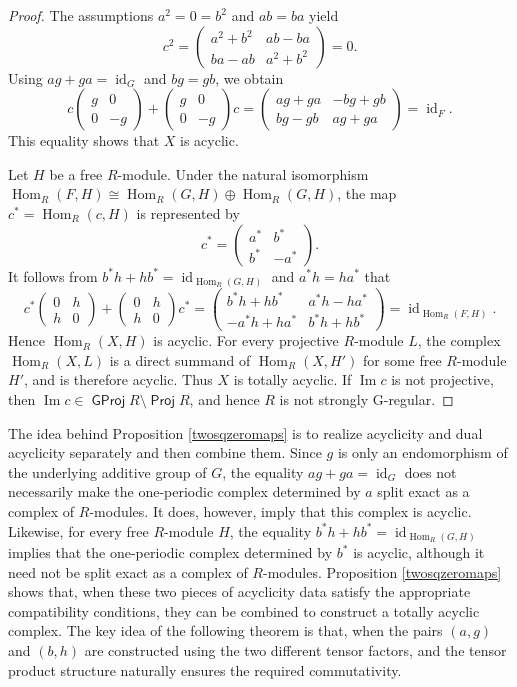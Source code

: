 \documentclass{amsart}
\theoremstyle{definition}
\theoremstyle{remark}
\numberwithin{equation}{thm}
\def\GProj{\operatorname{\mathsf{GProj}}}
\def\Hom{\operatorname{Hom}}
\def\id{\operatorname{id}}
\def\Im{\operatorname{Im}}
\def\Proj{\operatorname{\mathsf{Proj}}}
\begin{document}
\begin{proof}
The assumptions $a^2=0=b^2$ and $ab=ba$ yield
$$
c^2=
\begin{pmatrix}
a^2+b^2&ab-ba\\
ba-ab&a^2+b^2
\end{pmatrix}
=0.
$$
Using $ag+ga=\id_G$ and $bg=gb$, we obtain
$$
c
\begin{pmatrix}
g&0\\
0&-g
\end{pmatrix}
+
\begin{pmatrix}
g&0\\
0&-g
\end{pmatrix}c
=
\begin{pmatrix}
ag+ga&-bg+gb\\
bg-gb&ag+ga
\end{pmatrix}
=\id_F.
$$
This equality shows that $X$ is acyclic.

Let $H$ be a free $R$-module. Under the natural isomorphism $\Hom_R(F,H)\cong\Hom_R(G,H)\oplus\Hom_R(G,H)$, the map $c^*=\Hom_R(c,H)$ is represented by
$$
c^*=
\begin{pmatrix}
a^*&b^*\\
b^*&-a^*
\end{pmatrix}.
$$
It follows from $b^*h+hb^*=\id_{\Hom_R(G,H)}$ and $a^*h=ha^*$ that
$$
c^*
\begin{pmatrix}
0&h\\
h&0
\end{pmatrix}
+
\begin{pmatrix}
0&h\\
h&0
\end{pmatrix}
c^*
=
\begin{pmatrix}
b^*h+hb^*&a^*h-ha^*\\
-a^*h+ha^*&b^*h+hb^*
\end{pmatrix}
=\id_{\Hom_R(F,H)}.
$$
Hence $\Hom_R(X,H)$ is acyclic. For every projective $R$-module $L$, the complex $\Hom_R(X,L)$ is a direct summand of $\Hom_R(X,H')$ for some free $R$-module $H'$, and is therefore acyclic. Thus $X$ is totally acyclic. If $\Im c$ is not projective, then $\Im c\in\GProj R\setminus\Proj R$, and hence $R$ is not strongly G-regular.
\end{proof}

The idea behind Proposition \ref{twosqzeromaps} is to realize acyclicity and dual acyclicity separately and then combine them. Since $g$ is only an endomorphism of the underlying additive group of $G$, the equality $ag+ga=\id_G$ does not necessarily make the one-periodic complex determined by $a$ split exact as a complex of $R$-modules. It does, however, imply that this complex is acyclic. Likewise, for every free $R$-module $H$, the equality $b^*h+hb^*=\id_{\Hom_R(G,H)}$ implies that the one-periodic complex determined by $b^*$ is acyclic, although it need not be split exact as a complex of $R$-modules.
Proposition \ref{twosqzeromaps} shows that, when these two pieces of acyclicity data satisfy the appropriate compatibility conditions, they can be combined to construct a totally acyclic complex. The key idea of the following theorem is that, when the pairs $(a,g)$ and $(b,h)$ are constructed using the two different tensor factors, and the tensor product structure naturally ensures the required commutativity.
\end{document}
